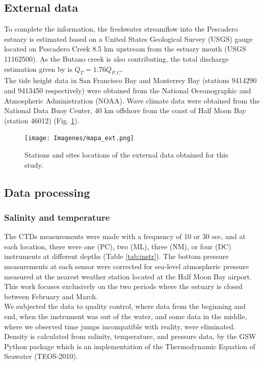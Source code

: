 \documentclass[tesis.tex]{subfiles}
\begin{document}
\subsection{External data}

To complete the information, the freshwater streamflow into the Pescadero estuary is estimated based on a United States Geological Survey (USGS) gauge located on Pescadero Creek 8.5 km upstream from the estuary mouth (USGS 11162500). As the Butano creek is also contributing, the total discharge estimation given by \cite{Williams2014} is $Q_{T} = 1.76 Q_{P,C}$. \\

The tide height data in San Francisco Bay and Monterrey Bay (stations 9414290 and 9413450 respectively) were obtained from the National Oceanographic and Atmospheric Administration (NOAA). Wave climate data were obtained from the National Data Buoy Center, 40 km offshore from the coast of Half Moon Bay (station 46012) (Fig. \ref{fig:mapext}). 

\begin{figure}[h!]
    \centering
    \texttt{[image: Imagenes/mapa\_ext.png]}
    \caption{Stations and sites locations of the external data obtained for this study.}
    \label{fig:mapext}
\end{figure}

\subsection{Data processing}

\subsubsection{Salinity and temperature}

The CTDs measurements were made with a frequency of 10 or 30 sec, and at each location, there were one (PC), two (ML), three (NM), or four (DC) instruments at different depths (Table \ref{tab:instr}). The bottom pressure measurements at each sensor were corrected for sea-level atmospheric pressure measured at the nearest weather station located at the Half Moon Bay airport. This work focuses exclusively on the two periods where the estuary is closed between February and March.\\

We subjected the data to quality control, where data from the beginning and end, when the instrument was out of the water, and some data in the middle, where we observed time jumps incompatible with reality, were eliminated. Density is calculated from salinity, temperature, and pressure data, by the GSW Python package which is an implementation of the Thermodynamic Equation of Seawater (TEOS-2010).\\
\end{document}
